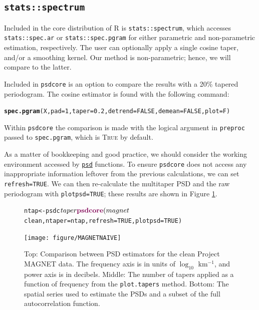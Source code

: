 \documentclass{article}\usepackage{graphicx, color}
\makeatletter
\newcommand{\hlfunctioncall}[1]{\textcolor[rgb]{0.501960784313725,0,0.329411764705882}{\textbf{#1}}}%
\newenvironment{kframe}{%
 \def\at@end@of@kframe{}%
 \ifinner\ifhmode%
  \def\at@end@of@kframe{\end{minipage}}%
  \begin{minipage}{\columnwidth}%
 \fi\fi%
 \def\FrameCommand##1{\hskip\@totalleftmargin \hskip-\fboxsep
 \colorbox{shadecolor}{##1}\hskip-\fboxsep
     \hskip-\linewidth \hskip-\@totalleftmargin \hskip\columnwidth}%
 \MakeFramed {\advance\hsize-\width
   \@totalleftmargin\z@ \linewidth\hsize
   \@setminipage}}%
 {\par\unskip\endMakeFramed%
 \at@end@of@kframe}
\newenvironment{knitrout}{}{} %
\newcommand{\SC}[1]{\textsc{#1}}
\newcommand{\Rcmd}[1]{\texttt{#1}}
\newcommand{\psd}[0]{\href{http://abarbour.github.com/psd/}{\color{blue}\Rcmd{psd}}}
\makeatother
\begin{document}
\subsection{\Rcmd{stats::spectrum}}

Included in the core distribution of R is \Rcmd{stats::spectrum}, which
accesses \Rcmd{stats::spec.ar} or \Rcmd{stats::spec.pgram} for either
parametric and non-parametric estimation, respectively.  
The user can optionally apply a single cosine taper, and/or a smoothing kernel.
Our method is non-parametric; hence, we will compare to the latter.

Included in \Rcmd{psdcore} is an option to compare the 
results with a 20\% tapered periodogram.
The cosine estimator is found with the following command:
\begin{knitrout}
\color{fgcolor}\begin{kframe}
\begin{alltt}
\hlfunctioncall{spec.pgram}(X, pad = 1, taper = 0.2, detrend = FALSE, demean = FALSE, plot = F)
\end{alltt}
\end{kframe}
\end{knitrout}

Within \Rcmd{psdcore} the comparison is
made with
the logical argument in \Rcmd{preproc} 
passed to \Rcmd{spec.pgram}, which is \SC{True} by default.

As a matter of bookkeeping and good practice, 
we should consider the working environment
accessed by \psd{} functions.
To ensure
\Rcmd{psdcore} does not access any inappropriate information leftover
from the previous calculations, we
can set \Rcmd{refresh=TRUE}.
We can then
re-calculate the multitaper PSD and the
raw periodogram with \Rcmd{plotpsd=TRUE}; these
results are shown in Figure \ref{fig:two}.
%
\begin{figure}[htb!]
\begin{center}
\begin{knitrout}
\color{fgcolor}\begin{kframe}
\begin{alltt}
ntap <- psdc$taper
\hlfunctioncall{psdcore}(magnet$clean, ntaper = ntap, refresh = TRUE, plotpsd = TRUE)
\end{alltt}
\end{kframe}
\texttt{[image: figure/MAGNETNAIVE]} 

\end{knitrout}

\caption{Top: Comparison between PSD estimators for the 
clean Project MAGNET data. The frequency axis is in units of $\log_{10}$ km$^{-1}$,
and power axis is in decibels.
Middle: The number of tapers applied as a function of frequency from
the \Rcmd{plot.tapers} method. 
Bottom: The spatial series used to estimate the PSDs and a subset
of the full autocorrelation function.}
\label{fig:two}
\end{center}
\end{figure}
\end{document}
